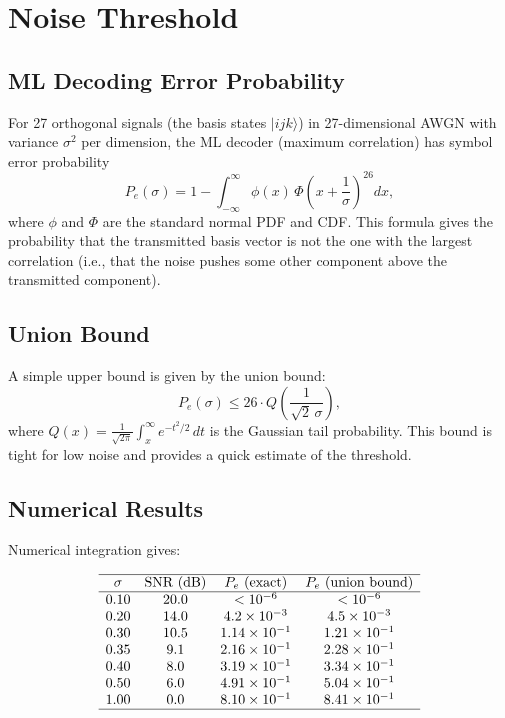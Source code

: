 \documentclass[12pt,a4paper]{article}
\begin{document}
\section{Noise Threshold}
\label{sec:noise}

\subsection{ML Decoding Error Probability}

For 27 orthogonal signals (the basis states $|ijk\rangle$) in 27-dimensional
AWGN with variance $\sigma^2$ per dimension, the ML decoder (maximum
correlation) has symbol error probability
\[
P_e(\sigma) = 1 - \int_{-\infty}^{\infty} \phi(x)\,
\Phi\!\left(x + \frac{1}{\sigma}\right)^{26} dx,
\]
where $\phi$ and $\Phi$ are the standard normal PDF and CDF. This formula
gives the probability that the transmitted basis vector is not the one
with the largest correlation (i.e., that the noise pushes some other
component above the transmitted component).

\subsection{Union Bound}

A simple upper bound is given by the union bound:
\[
P_e(\sigma) \le 26 \cdot Q\!\left(\frac{1}{\sqrt2\,\sigma}\right),
\]
where $Q(x) = \frac{1}{\sqrt{2\pi}}\int_x^\infty e^{-t^2/2}\,dt$ is the
Gaussian tail probability. This bound is tight for low noise and provides
a quick estimate of the threshold.

\subsection{Numerical Results}

Numerical integration gives:

\[
\begin{array}{cccc}
\hline
\sigma & \text{SNR (dB)} & P_e\text{ (exact)} & P_e\text{ (union bound)} \\
\hline
0.10 & 20.0 & <10^{-6} & <10^{-6} \\
0.20 & 14.0 & 4.2\times10^{-3} & 4.5\times10^{-3} \\
0.30 & 10.5 & 1.14\times10^{-1} & 1.21\times10^{-1} \\
0.35 & 9.1 & 2.16\times10^{-1} & 2.28\times10^{-1} \\
0.40 & 8.0 & 3.19\times10^{-1} & 3.34\times10^{-1} \\
0.50 & 6.0 & 4.91\times10^{-1} & 5.04\times10^{-1} \\
1.00 & 0.0 & 8.10\times10^{-1} & 8.41\times10^{-1} \\
\hline
\end{array}
\]
\end{document}

